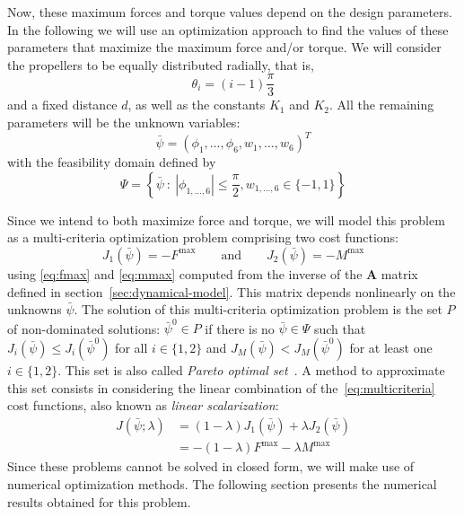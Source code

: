 Now, these maximum forces and torque values depend on the design
parameters. In the following we will use an optimization approach to
find the values of these parameters that maximize the maximum force
and/or torque. We will consider the propellers to be equally
distributed radially, that is,
\begin{equation}
  \label{eq:thetas}
  \theta_i = (i-1) \frac{\pi}{3}
\end{equation}
and a fixed distance $d$, as well as the constants $K_1$ and $K_2$. All the
remaining parameters will be the unknown variables:
\begin{equation}
  \bar{\psi} = ( \phi_1, \ldots, \phi_6, w_1,\ldots, w_6 )^T
\end{equation}
with the feasibility domain defined by
\begin{equation}
  \Psi = \left\{ \bar{\psi} \::\: |\phi_{1,\ldots,6}| \leq
  \frac{\pi}{2}, w_{1,\ldots,6}\in\{-1,1\} \right\}
\end{equation}

Since we intend to both maximize force and torque, we will model this
problem as a multi-criteria optimization problem comprising two cost functions:
\begin{equation}
  \label{eq:multicriteria}
  J_1(\bar{\psi}) = -F^\mathrm{max} \qquad \mathrm{and} \qquad J_2(\bar{\psi}) = -M^\mathrm{max}
\end{equation}
using \eqref{eq:fmax} and \eqref{eq:mmax} computed from the inverse of
the $\mathbf{A}$ matrix defined in
section~\ref{sec:dynamical-model}. This matrix depends nonlinearly on
the unknowns $\bar{\psi}$. The solution of this multi-criteria
optimization problem is the set $P$ of non-dominated solutions:
$\bar{\psi}^0\in P$ if there is no $\bar{\psi}\in\Psi$ such that
$J_i(\bar{\psi})\leq J_i(\bar{\psi}^0)$ for all $i\in\{1,2\}$ and
$J_M(\bar{\psi})< J_M(\bar{\psi}^0)$ for at least one
$i\in\{1,2\}$. This set is also called \emph{Pareto optimal
  set}~\cite{statnikov95}. A method to approximate this set consists
in considering the linear combination of the~\eqref{eq:multicriteria}
cost functions, also known as \emph{linear scalarization}:
\begin{equation}
  \begin{aligned}
    \label{eq:linscal}
    J(\bar{\psi};\lambda) &= (1-\lambda) J_1(\bar{\psi}) + \lambda
    J_2(\bar{\psi}) \\
    &= -(1-\lambda) F^\mathrm{max} - \lambda M^\mathrm{max}
  \end{aligned}
\end{equation}
Since these problems cannot be solved in closed form, we will make use
of numerical optimization methods. The following section presents the
numerical results obtained for this problem.


